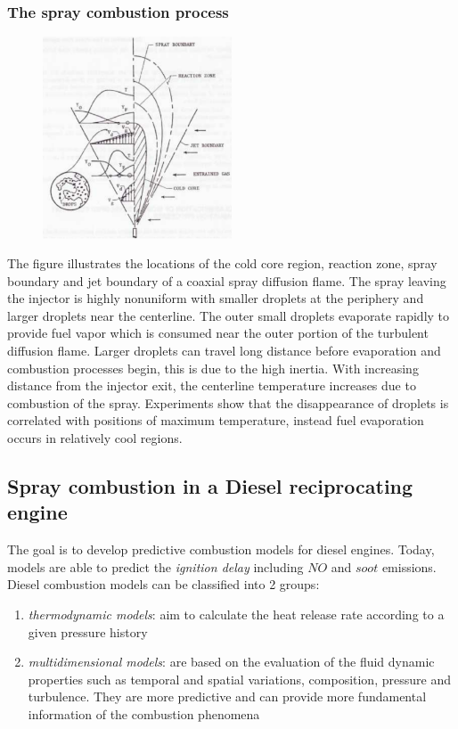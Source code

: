 \documentclass[12pt]{article}
\begin{document}
\subsubsection{The spray combustion process}

\begin{figure}[!ht]
\centering
\includegraphics[width=0.5\textwidth]{figures/core.png}
\end{figure}

The figure illustrates the locations of the cold core region, reaction zone, spray boundary and jet boundary of a coaxial spray diffusion flame. The spray leaving the injector is highly nonuniform with smaller droplets at the periphery and larger droplets near the centerline. The outer small droplets evaporate rapidly to provide fuel vapor which is consumed near the outer portion of the turbulent diffusion flame. Larger droplets can travel long distance before evaporation and combustion processes begin, this is due to the high inertia. With increasing distance from the injector exit, the centerline temperature increases due to combustion of the spray. Experiments show that the disappearance of droplets is correlated with positions of maximum temperature, instead fuel evaporation occurs in relatively cool regions.

\subsection{Spray combustion in a Diesel reciprocating engine}

The goal is to develop predictive combustion models for diesel engines. Today, models are able to predict the \textit{ignition delay} including $NO$ and $soot$ emissions. Diesel combustion models can be classified into 2 groups:
\begin{enumerate}
    \item \textit{thermodynamic models}: aim to calculate the heat release rate according to a given pressure history
    \item  \textit{multidimensional models}: are based on the evaluation of the fluid dynamic properties such as temporal and spatial variations, composition, pressure and turbulence. They are more predictive and can provide more fundamental information of the combustion phenomena
\end{enumerate}
\end{document}
